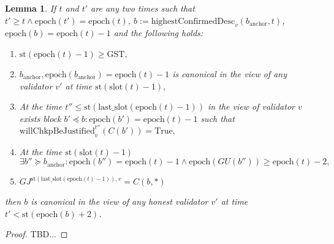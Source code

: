 \documentclass{article}
\newtheorem{lemma}{Lemma}
\begin{document}
\begin{lemma}
If $t$ and $t'$ are any two times such that $t' \geq t \wedge \text{epoch}(t') = \text{epoch}(t)$, $b := \text{highestConfirmedDesc}_v(b_{\text{anchor}}, t)$, $\text{epoch}(b) = \text{epoch}(t) - 1$ and the following holds:

\begin{enumerate}
    \item $\text{st}(\text{epoch}(t) - 1) \geq \text{GST},$
    \item $b_{\text{anchor}}, \text{epoch}(b_{\text{anchor}}) = \text{epoch}(t) - 1$ is canonical in the view of any validator $v'$ at time $\text{st}(\text{slot}(t) - 1),$
    \item At the time $t'' \leq \text{st}(\text{last\_slot}(\text{epoch}(t) - 1))$ in the view of validator $v$ exists block $b' \preceq b : \text{epoch}(b') = \text{epoch}(t) - 1$ such that $\text{willChkpBeJustified}^{t''}_v(C(b')) = \text{True},$
    \item At the time $\text{st}(\text{slot}(t) - 1)$ $\exists b'' \succeq b_{\text{anchor}} : \text{epoch}(b'') = \text{epoch}(t) - 1 \wedge \text{epoch}(GU(b'')) \geq \text{epoch}(t) - 2,$
    \item $GJ^{\text{st}(\text{last\_slot}(\text{epoch}(t) - 1)),v} = C(b, *)$
\end{enumerate}

then $b$ is canonical in the view of any honest validator $v'$ at time $t' < \text{st}(\text{epoch}(b) + 2)$.
\end{lemma}

\begin{proof}
    TBD...
\end{proof}
\end{document}
